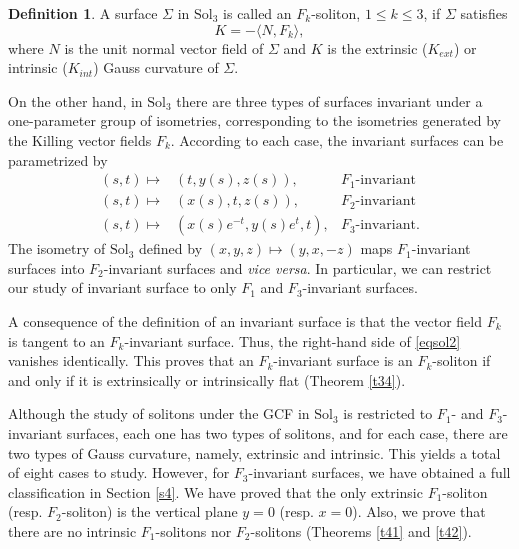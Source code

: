 \documentclass[a4paper,12pt]{amsart}
\theoremstyle{plain}
\theoremstyle{definition}
\newtheorem{definition}[theorem]{Definition}
\def\sol{\text{Sol}_3}
\begin{document}
\begin{definition} A surface $\Sigma$ in $\sol$ is called an $F_k$-soliton, $1\leq k\leq 3$, if $\Sigma$ satisfies
\begin{equation}\label{eqsol2}
K = -\langle N,F_k\rangle,
\end{equation}
where $N$ is the unit normal vector field of $\Sigma$ and $K$ is the extrinsic ($K_{ext}$) or intrinsic ($K_{int}$) Gauss curvature of $\Sigma$.
\end{definition} 

On the other hand, in $\sol$ there are three types of surfaces invariant under a one-parameter group of isometries, corresponding to the isometries generated by the Killing vector fields $F_k$. According to each case, the invariant surfaces can be parametrized by 
\begin{align*}
(s,t)\mapsto& (t, y(s), z(s)), & \mbox{$F_1$-invariant}\\
(s,t)\mapsto & (x(s),t ,z(s)), & \mbox{$F_2$-invariant}\\
(s,t)\mapsto& (x(s)e^{-t}, y(s)e^t, t), & \mbox{$F_3$-invariant}.
\end{align*}
The isometry of $\sol$ defined by $(x,y,z)\mapsto (y,x,-z)$ maps $F_1$-invariant surfaces into $F_2$-invariant surfaces and {\it vice versa}. In particular, we can restrict our study of invariant surface to only $F_1$ and $F_3$-invariant surfaces. 

A consequence of the definition of an invariant surface is that the vector field $F_k$ is tangent to an $F_k$-invariant surface. Thus, the right-hand side of \eqref{eqsol2} vanishes identically. This proves that an $F_k$-invariant surface is an $F_k$-soliton if and only if it is extrinsically or intrinsically flat (Theorem \ref{t34}). 

Although the study of solitons under the GCF in $\sol$ is restricted to $F_1$- and $F_3$-invariant surfaces, each one has two types of solitons, and for each case, there are two types of Gauss curvature, namely, extrinsic and intrinsic. This yields a total of eight cases to study. However, for $F_3$-invariant surfaces, we have obtained a full classification in Section \ref{s4}. We have proved that the only extrinsic $F_1$-soliton (resp. $F_2$-soliton) is the vertical plane $y = 0$ (resp. $x=0$). Also, we prove that there are no intrinsic $F_1$-solitons nor $F_2$-solitons (Theorems \ref{t41} and \ref{t42}).
 
\end{document}
